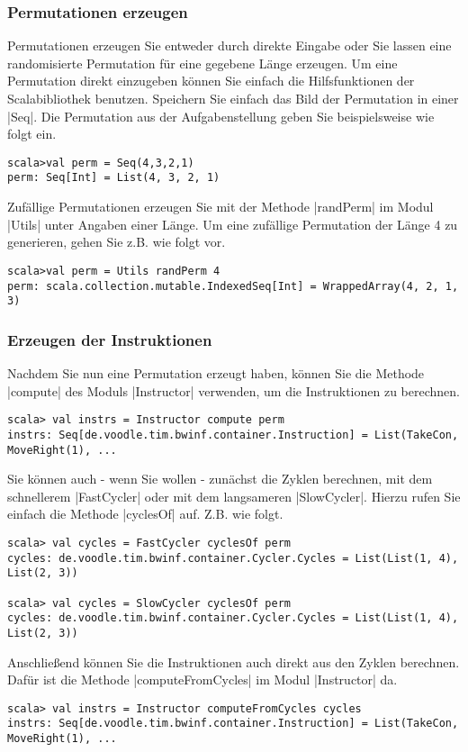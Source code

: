 \subsubsection{Permutationen erzeugen}
Permutationen erzeugen Sie entweder durch direkte Eingabe oder Sie lassen eine randomisierte Permutation für eine gegebene Länge erzeugen.
Um eine Permutation direkt einzugeben können Sie einfach die Hilfsfunktionen der Scalabibliothek benutzen.
Speichern Sie einfach das Bild der Permutation in einer |Seq|. Die Permutation aus der Aufgabenstellung geben Sie beispielsweise wie folgt ein.
\begin{lstlisting}
scala>val perm = Seq(4,3,2,1)
perm: Seq[Int] = List(4, 3, 2, 1)  
\end{lstlisting}
Zufällige Permutationen erzeugen Sie mit der Methode |randPerm| im Modul |Utils| unter Angaben einer Länge.
Um eine zufällige Permutation der Länge 4 zu generieren, gehen Sie z.B. wie folgt vor.
\begin{lstlisting}
scala>val perm = Utils randPerm 4                                                                                                 
perm: scala.collection.mutable.IndexedSeq[Int] = WrappedArray(4, 2, 1, 3)  
\end{lstlisting}
\subsubsection{Erzeugen der Instruktionen}
Nachdem Sie nun eine Permutation erzeugt haben, können Sie die Methode |compute| des Moduls |Instructor| verwenden, um die Instruktionen zu berechnen.
\begin{lstlisting}
scala> val instrs = Instructor compute perm
instrs: Seq[de.voodle.tim.bwinf.container.Instruction] = List(TakeCon, MoveRight(1), ...
\end{lstlisting}
Sie können auch - wenn Sie wollen - zunächst die Zyklen berechnen, mit dem schnellerem |FastCycler| oder mit dem langsameren |SlowCycler|.
Hierzu rufen Sie einfach die Methode |cyclesOf| auf. Z.B. wie folgt.
\begin{lstlisting}
scala> val cycles = FastCycler cyclesOf perm
cycles: de.voodle.tim.bwinf.container.Cycler.Cycles = List(List(1, 4), List(2, 3))

scala> val cycles = SlowCycler cyclesOf perm
cycles: de.voodle.tim.bwinf.container.Cycler.Cycles = List(List(1, 4), List(2, 3))
\end{lstlisting}
Anschließend können Sie die Instruktionen auch direkt aus den Zyklen berechnen. Dafür ist die Methode |computeFromCycles| im Modul |Instructor| da.
\begin{lstlisting}
scala> val instrs = Instructor computeFromCycles cycles
instrs: Seq[de.voodle.tim.bwinf.container.Instruction] = List(TakeCon, MoveRight(1), ...
\end{lstlisting}
